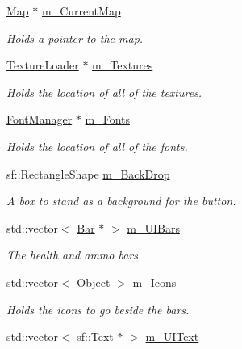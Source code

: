 \begin{DoxyCompactItemize}
\item 
\hyperlink{class_map}{Map} $\ast$ \hyperlink{class_h_u_d_window_a4f060daf799a5fb07fe243398360c650}{m\+\_\+\+Current\+Map}
\begin{DoxyCompactList}\small\item\em Holds a pointer to the map. \end{DoxyCompactList}\item 
\hyperlink{class_texture_loader}{Texture\+Loader} $\ast$ \hyperlink{class_h_u_d_window_ab920c7c56b7eb36e7aa2a515cccb0b40}{m\+\_\+\+Textures}
\begin{DoxyCompactList}\small\item\em Holds the location of all of the textures. \end{DoxyCompactList}\item 
\hyperlink{class_font_manager}{Font\+Manager} $\ast$ \hyperlink{class_h_u_d_window_a0126d31748ae1ba55ea12db31693a246}{m\+\_\+\+Fonts}
\begin{DoxyCompactList}\small\item\em Holds the location of all of the fonts. \end{DoxyCompactList}\item 
sf\+::\+Rectangle\+Shape \hyperlink{class_h_u_d_window_acac66ce4a62cd00c2b23045c7b195244}{m\+\_\+\+Back\+Drop}
\begin{DoxyCompactList}\small\item\em A box to stand as a background for the button. \end{DoxyCompactList}\item 
std\+::vector$<$ \hyperlink{class_bar}{Bar} $\ast$ $>$ \hyperlink{class_h_u_d_window_a6921a475707f3f79c8ed40d8dc3f84dc}{m\+\_\+\+U\+I\+Bars}
\begin{DoxyCompactList}\small\item\em The health and ammo bars. \end{DoxyCompactList}\item 
std\+::vector$<$ \hyperlink{class_object}{Object} $>$ \hyperlink{class_h_u_d_window_aa70ebf405fff3d3f1af0291d26532c51}{m\+\_\+\+Icons}
\begin{DoxyCompactList}\small\item\em Holds the icons to go beside the bars. \end{DoxyCompactList}\item 
std\+::vector$<$ sf\+::\+Text $\ast$ $>$ \hyperlink{class_h_u_d_window_a5343d0d3d11dfb0422e22f43a3b24e73}{m\+\_\+\+U\+I\+Text}

\end{DoxyCompactItemize}
